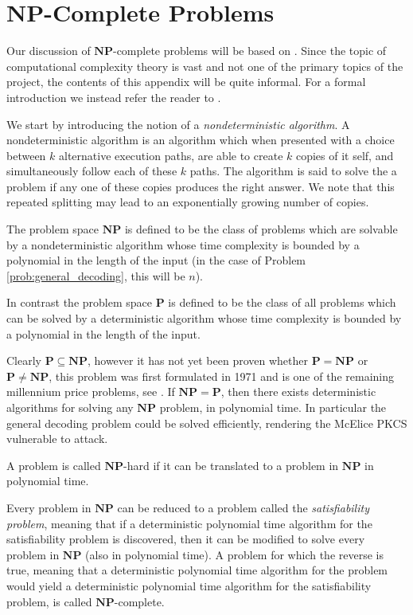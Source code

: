 \chapter{$\mathbf{NP}$-Complete Problems}\label{app:np_completeness}
Our discussion of $\mathbf{NP}$-complete problems will be based on \cite{general_decoding_problem_is_np}. Since the topic of computational complexity theory is vast and not one of the primary topics of the project, the contents of this appendix will be quite informal. For a formal introduction we instead refer the reader to \cite{complexity}.

We start by introducing the notion of a \textit{nondeterministic algorithm}. A nondeterministic algorithm is an algorithm which when presented with a choice between $k$ alternative execution paths, are able to create $k$ copies of it self, and simultaneously follow each of these $k$ paths. The algorithm is said to solve the a problem if any one of these copies produces the right answer. We note that this repeated splitting may lead to an exponentially growing number of copies.

The problem space $\mathbf{NP}$ is defined to be the class of problems which are solvable by a nondeterministic algorithm whose time complexity is bounded by a polynomial in the length of the input (in the case of Problem \ref{prob:general_decoding}, this will be $n$).

In contrast the problem space $\mathbf{P}$ is defined to be the class of all problems which can be solved by a deterministic algorithm whose time complexity is bounded by a polynomial in the length of the input.

Clearly $\mathbf{P} \subseteq \mathbf{NP}$, however it has not yet been proven whether $\mathbf{P} = \mathbf{NP}$ or $\mathbf{P} \neq \mathbf{NP}$, this problem was first formulated in 1971 and is one of the remaining millennium price problems, see \cite{milenium}. If $\mathbf{NP} = \mathbf{P}$, then there exists deterministic algorithms for solving any $\mathbf{NP}$ problem, in polynomial time. In particular the general decoding problem could be solved efficiently, rendering the McElice PKCS vulnerable to attack.

A problem is called $\mathbf{NP}$-hard if it can be translated to a problem in $\textbf{NP}$ in polynomial time.

Every problem in $\mathbf{NP}$ can be reduced to a problem called the \textit{satisfiability problem}, meaning that if a deterministic polynomial time algorithm for the satisfiability problem is discovered, then it can be modified to solve every problem in $\mathbf{NP}$ (also in polynomial time). A problem for which the reverse is true, meaning that a deterministic polynomial time algorithm for the problem would yield a deterministic polynomial time algorithm for the satisfiability problem, is called $\mathbf{NP}$-complete.

